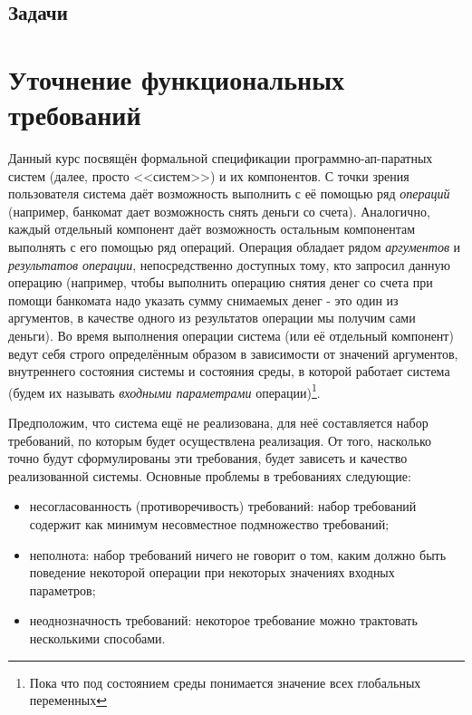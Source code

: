 \documentclass[14pt, twoside]{extreport}
\begin{document}
    

    \section*{Задачи}

    

    




\chapter{Уточнение функциональных требований}



Данный курс посвящён формальной спецификации программно-ап-паратных систем (далее, просто <<систем>>) и их компонентов. С точки зрения пользователя система даёт возможность выполнить с её помощью ряд \emph{операций} (например, банкомат дает возможность снять деньги со счета). Аналогично, каждый отдельный компонент даёт возможность остальным компонентам выполнять с его помощью ряд операций. Операция обладает рядом \emph{аргументов} и \emph{результатов операции}, непосредственно доступных тому, кто запросил данную операцию (например, чтобы выполнить операцию снятия денег со счета при помощи банкомата надо указать сумму снимаемых денег - это один из аргументов, в качестве одного из результатов операции мы получим сами деньги). Во время выполнения операции система (или её отдельный компонент) ведут себя строго определённым образом в зависимости от значений аргументов, внутреннего состояния системы и состояния среды, в которой работает система (будем их называть \emph{входными параметрами} операции)\footnote{Пока что под состоянием среды понимается значение всех глобальных переменных}.

Предположим, что система ещё не реализована, для неё составляется набор требований, по которым будет осуществлена реализация. От того, насколько точно будут сформулированы эти требования, будет зависеть и качество реализованной системы. Основные проблемы в требованиях следующие:
\begin{itemize}
  \item несогласованность (противоречивость) требований: набор требований содержит как минимум несовместное подмножество требований;
  \item неполнота: набор требований ничего не говорит о том, каким должно быть поведение некоторой операции при некоторых значениях входных параметров;
  \item неоднозначность требований: некоторое требование можно трактовать несколькими способами.
\end{itemize}
\end{document}
